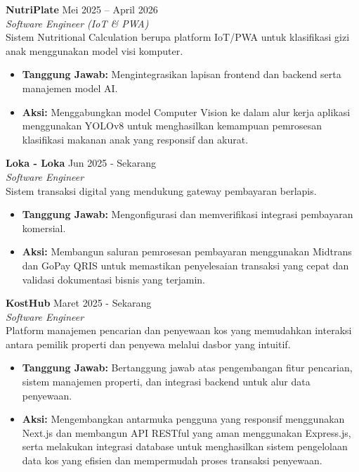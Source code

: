 \documentclass[11pt,a4paper]{article}
\begin{document}
\textbf{NutriPlate} \hfill Mei 2025 -- April 2026 \\
\textit{Software Engineer (IoT \& PWA)} \\
Sistem Nutritional Calculation berupa platform IoT/PWA untuk klasifikasi gizi anak menggunakan model visi komputer.
\begin{itemize}[leftmargin=0.25in]
    \item \textbf{Tanggung Jawab:} Mengintegrasikan lapisan frontend dan backend serta manajemen model AI.
    \item \textbf{Aksi:} Menggabungkan model Computer Vision ke dalam alur kerja aplikasi menggunakan YOLOv8 untuk menghasilkan kemampuan pemrosesan klasifikasi makanan anak yang responsif dan akurat.
\end{itemize}

\textbf{Loka - Loka} \hfill Jun 2025 - Sekarang \\
\textit{Software Engineer} \\
Sistem transaksi digital yang mendukung gateway pembayaran berlapis.
\begin{itemize}[leftmargin=0.25in]
    \item \textbf{Tanggung Jawab:} Mengonfigurasi dan memverifikasi integrasi pembayaran komersial.
    \item \textbf{Aksi:} Membangun saluran pemrosesan pembayaran menggunakan Midtrans dan GoPay QRIS untuk memastikan penyelesaian transaksi yang cepat dan validasi dokumentasi bisnis yang terjamin.
\end{itemize}

\textbf{KostHub} \hfill Maret 2025 - Sekarang \\
\textit{Software Engineer} \\
Platform manajemen pencarian dan penyewaan kos yang memudahkan interaksi antara pemilik properti dan penyewa melalui dasbor yang intuitif.
\begin{itemize}[leftmargin=0.25in]
    \item \textbf{Tanggung Jawab:} Bertanggung jawab atas pengembangan fitur pencarian, sistem manajemen properti, dan integrasi backend untuk alur data penyewaan.
    \item \textbf{Aksi:} Mengembangkan antarmuka pengguna yang responsif menggunakan Next.js dan membangun API RESTful yang aman menggunakan Express.js, serta melakukan integrasi database untuk menghasilkan sistem pengelolaan data kos yang efisien dan mempermudah proses transaksi penyewaan.
\end{itemize}
\end{document}

